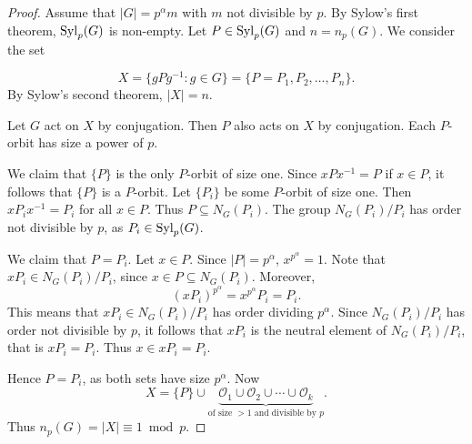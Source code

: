 \begin{proof}
    Assume that $|G|=p^{\alpha}m$ with $m$ not divisible by $p$.
    By Sylow's first theorem, $\mathrm{Syl}_p(G)$ is non-empty. Let $P\in\mathrm{Syl}_p(G)$ and $n=n_p(G)$. We consider the set  
    
        \[
        X=\{gPg^{-1}:g\in G\}=\{P=P_1,P_2,\dots,P_n\}.
        \]
    By Sylow's second theorem, $|X|=n$.

    Let $G$ act on $X$ by conjugation. Then $P$ also acts on 
    $X$ by conjugation. Each $P$-orbit has size a power of $p$. 
    
    We claim that $\{P\}$ is the only $P$-orbit of size one.  
    Since $xPx^{-1}=P$ if $x\in P$, it follows that
    $\{P\}$ is a $P$-orbit. Let $\{P_i\}$ be some $P$-orbit
    of size one. Then 
        $xP_ix^{-1}=P_i$ for all 
        $x\in P$. Thus $P\subseteq N_G(P_i)$. The group 
        $N_G(P_i)/P_i$ has order not divisible by $p$, as $P_i\in\mathrm{Syl}_p(G)$. 
        
        We claim that $P=P_i$. Let 
        $x\in P$. Since
        $|P|=p^\alpha$, $x^{p^{\alpha}}=1$. 
        Note that $xP_i\in N_G(P_i)/P_i$, since $x\in P\subseteq N_G(P_i)$. Moreover, 
        \[
        (xP_i)^{p^{\alpha}}=x^{p^{\alpha}}P_i=P_i.
        \]
        This means that 
        $xP_i\in N_G(P_i)/P_i$ has order dividing $p^{\alpha}$. Since 
        $N_G(P_i)/P_i$ has order not divisible by $p$, it follows 
        that $xP_i$ is the neutral element of $N_G(P_i)/P_i$, that is $xP_i=P_i$. Thus
        $x\in xP_i=P_i$. 
                 
        
        Hence $P=P_i$, as both sets 
        have size $p^{\alpha}$. Now 
        \[
        X=\{P\}\cup \underbrace{\mathcal{O}_1\cup\mathcal{O}_2\cup\cdots\cup\mathcal{O}_k}_{\text{of size $>1$ and divisible by $p$}}.
        \]
        Thus $n_p(G)=|X|\equiv 1\bmod p$.
\end{proof}


